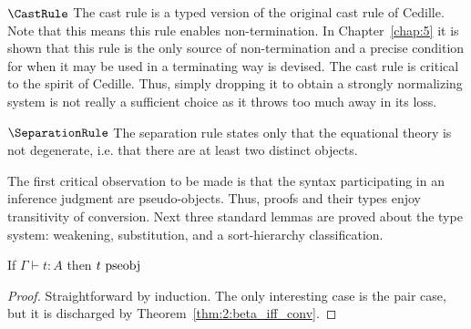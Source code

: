 $\CastRule$ The cast rule is a typed version of the original cast rule of Cedille.
Note that this means this rule enables non-termination.
In Chapter~\ref{chap:5} it is shown that this rule is the only source of non-termination and a precise condition for when it may be used in a terminating way is devised.
The cast rule is critical to the spirit of Cedille.
Thus, simply dropping it to obtain a strongly normalizing system is not really a sufficient choice as it throws too much away in its loss.

$\SeparationRule$ The separation rule states only that the equational theory is not degenerate, i.e. that there are at least two distinct objects.



The first critical observation to be made is that the syntax participating in an inference judgment are pseudo-objects.
Thus, proofs and their types enjoy transitivity of conversion.
Next three standard lemmas are proved about the type system: weakening, substitution, and a sort-hierarchy classification.

\begin{lemma}
    If $\Gamma \vdash t : A$ then $t~\textnormal{pseobj}$
    \label{lem:2:infer_implies_pseobj}
\end{lemma}
\begin{proof}
    Straightforward by induction.
    The only interesting case is the pair case, but it is discharged by Theorem~\ref{thm:2:beta_iff_conv}.
\end{proof}

